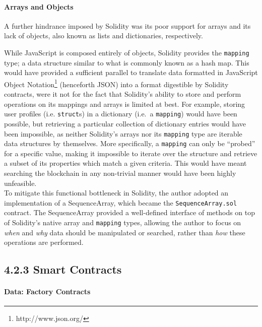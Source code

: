 \documentclass[12pt]{report}
\let\oldparagraph\paragraph
\renewcommand{\paragraph}[1]{\oldparagraph{#1}\mbox{}}
\begin{document}
\paragraph{Arrays and Objects}\label{arrays-and-objects}

A further hindrance imposed by Solidity was its poor support for arrays
and its lack of objects, also known as lists and dictionaries,
respectively.

While JavaScript is composed entirely of objects, Solidity provides the
\texttt{mapping} type; a data structure similar to what is commonly
known as a hash map. This would have provided a sufficient
parallel to translate data formatted in JavaScript Object
Notation\footnote{http://www.json.org/} (henceforth JSON) into a
format digestible by Solidity contracts, were it not for the fact that
Solidity's ability to store and perform operations on its mappings and
arrays is limited at best. For example, storing user profiles (i.e.
\texttt{struct}s) in a dictionary (i.e.~a \texttt{mapping}) would have
been possible, but retrieving a particular collection of dictionary
entries would have been impossible, as neither Solidity's arrays nor its
\texttt{mapping} type are iterable data structures by themselves. More
specifically, a \texttt{mapping} can only be ``probed'' for a specific
value, making it impossible to iterate over the structure and retrieve a
subset of its properties which match a given criteria. This would have
meant searching the blockchain in any non-trivial manner would have been
highly unfeasible.\\
To mitigate this functional bottleneck in Solidity, the author adopted
an implementation of a SequenceArray\cite{Shaffer2013}, which became the
\texttt{SequenceArray.sol} contract. The SequenceArray provided a
well-defined interface of methods on top of Solidity's native array and
\texttt{mapping} types, allowing the author to focus on \emph{when} and
\emph{why} data should be manipulated or searched, rather than
\emph{how} these operations are performed.

\subsection{4.2.3 Smart Contracts}\label{smart-contracts}

\paragraph{Data: Factory Contracts}\label{data-factory-contracts}
\end{document}
